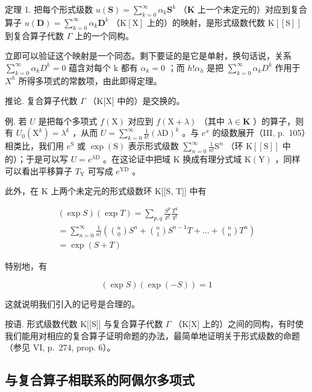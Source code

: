 定理 1. 把每个形式级数 \(u(\mathbf{S}) = \sum_{k=0}^{\infty} \alpha_k \mathbf{S}^k\) （\(\mathbf{K}\) 上一个未定元的）对应到复合算子 \(u(\mathbf{D}) = \sum_{k=0}^{\infty} \alpha_k \mathbf{D}^k\) （\(\mathrm{K}[\mathrm{X}]\) 上的）的映射，是形式级数代数 \(\mathrm{K}[[\mathrm{S}]]\) 到复合算子代数 \(\Gamma\) 上的一个同构。

立即可以验证这个映射是一个同态。剩下要证的是它是单射，换句话说，关系 \(\sum_{k=0}^{\infty}\alpha_{k}D^{k}=0\) 蕴含对每个 k 都有 \(\alpha_{k}=0\) ；而 \(h!\alpha_{h}\) 是把 \(\sum_{k=0}^{\infty}\alpha_{k}D^{k}\) 作用于 \(X^{h}\) 所得多项式的常数项，由此即得定理。

推论. 复合算子代数 \(\Gamma\) （K{[}X{]} 中的）是交换的。

例. 若 \(U\) 是把每个多项式 \(f(\mathrm{X})\) 对应到 \(f(\mathrm{X} + \lambda)\) （其中 \(\lambda \in \mathbf{K}\) ）的算子，则有 \(U_0(\mathrm{X}^k) = \lambda^k\) ，从而 \(U = \sum_{k=0}^{\infty} \frac{1}{k!} (\lambda \mathrm{D})^k\) 。与 \(e^x\) 的级数展开（III, p.~105）相类比，我们用 \(e^{\mathrm{S}}\) 或 \(\exp(\mathrm{S})\) 表示形式级数 \(\sum_{n=0}^{\infty} \frac{1}{n!} \mathrm{S}^n\) （环 \(\mathrm{K}[[\mathrm{S}]]\) 中的）；于是可以写 \(U = e^{\lambda \mathrm{D}}\) 。在这论证中把域 \(\mathrm{K}\) 换成有理分式域 \(\mathrm{K}(\mathrm{Y})\) ，同样可以看出平移算子 \(T_{\mathrm{Y}}\) 可写成 \(e^{\mathrm{YD}}\) 。

此外，在 K 上两个未定元的形式级数环 K{[}{[}S, T{]}{]} 中有

\[
\begin{array}{l} (\exp S) (\exp T) = \sum_ {p, q} \frac {S ^ {p}}{p !} \frac {T ^ {q}}{q !} \\ = \sum_ {n = 0} ^ {\infty} \frac {1}{n !} \left(\binom {n} {0} S ^ {n} + \binom {n} {1} S ^ {n - 1} T + \dots + \binom {n} {n} T ^ {n}\right) \\ = \exp (S + T) \end{array}\tag{4}
\]

特别地，有

\[
(\exp S) (\exp (- S)) = 1\tag{5}
\]

这就说明我们引入的记号是合理的。

按语. 形式级数代数 K{[}{[}S{]}{]} 与复合算子代数 \(\Gamma\) （K{[}X{]} 上的）之间的同构，有时使我们能用对相应的复合算子证明命题的办法，最简单地证明关于形式级数的命题（参见 VI, p.~274, prop. 6）。

\subsection{与复合算子相联系的阿佩尔多项式}

